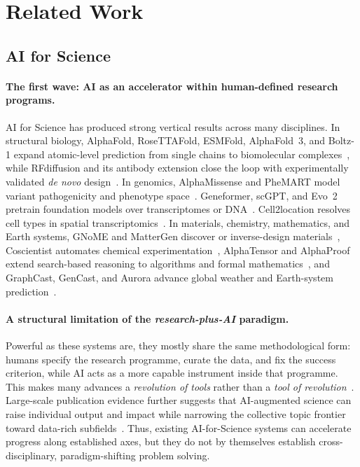 \section{Related Work}
\label{sec:related}


\subsection{AI for Science}
\label{sec:rel:ai4sci}
\paragraph{The first wave: AI as an accelerator within human-defined research programs.}
AI for Science has produced strong vertical results across many disciplines. In structural biology, AlphaFold, RoseTTAFold, ESMFold, AlphaFold~3, and Boltz-1 expand atomic-level prediction from single chains to biomolecular complexes~\citep{jumper2021highly,baek2021accurate,lin2023evolutionary,abramson2024accurate,wohlwend2025boltz}, while RFdiffusion and its antibody extension close the loop with experimentally validated \emph{de novo} design~\citep{watson2023novo,bennett2026atomically}. In genomics, AlphaMissense and PheMART model variant pathogenicity and phenotype space~\citep{cheng2023accurate,wen2026phenotypic}. Geneformer, scGPT, and Evo~2 pretrain foundation models over transcriptomes or DNA~\citep{theodoris2023transfer,cui2024scgpt,brixi2026genome}. Cell2location resolves cell types in spatial transcriptomics~\citep{kleshchevnikov2022cell2location}. In materials, chemistry, mathematics, and Earth systems, GNoME and MatterGen discover or inverse-design materials~\citep{merchant2023scaling,zeni2025generative}, Coscientist automates chemical experimentation~\citep{boiko2023autonomous}, AlphaTensor and AlphaProof extend search-based reasoning to algorithms and formal mathematics~\citep{fawzi2022discovering,hubert2025olympiad}, and GraphCast, GenCast, and Aurora advance global weather and Earth-system prediction~\citep{lam2023learning,price2025probabilistic,bodnar2025foundation}.

\paragraph{A structural limitation of the \emph{research-plus-AI} paradigm.}
Powerful as these systems are, they mostly share the same methodological form: humans specify the research programme, curate the data, and fix the success criterion, while AI acts as a more capable instrument inside that programme. This makes many advances a \emph{revolution of tools} rather than a \emph{tool of revolution}~\citep{zhou2025advancing}. Large-scale publication evidence further suggests that AI-augmented science can raise individual output and impact while narrowing the collective topic frontier toward data-rich subfields~\citep{hao2026artificial}. Thus, existing AI-for-Science systems can accelerate progress along established axes, but they do not by themselves establish cross-disciplinary, paradigm-shifting problem solving.

